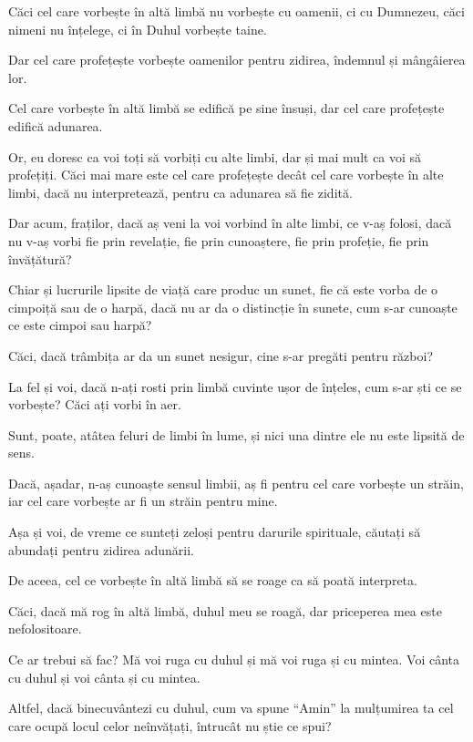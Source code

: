 {Căci cel care vorbește în altă limbă nu vorbește cu oamenii, ci cu Dumnezeu, căci nimeni nu înțelege, ci în Duhul vorbește taine.

Dar cel care profețește vorbește oamenilor pentru zidirea, îndemnul și mângâierea lor.

Cel care vorbește în altă limbă se edifică pe sine însuși, dar cel care profețește edifică adunarea.

Or, eu doresc ca voi toți să vorbiți cu alte limbi, dar și mai mult ca voi să profețiți. Căci mai mare este cel care profețește decât cel care vorbește în alte limbi, dacă nu interpretează, pentru ca adunarea să fie zidită.


\par }{\PP {}Dar acum, fraților, dacă aș veni la voi vorbind în alte limbi, ce v-aș folosi, dacă nu v-aș vorbi fie prin revelație, fie prin cunoaștere, fie prin profeție, fie prin învățătură?

Chiar și lucrurile lipsite de viață care produc un sunet, fie că este vorba de o cimpoiță sau de o harpă, dacă nu ar da o distincție în sunete, cum s-ar cunoaște ce este cimpoi sau harpă?

Căci, dacă trâmbița ar da un sunet nesigur, cine s-ar pregăti pentru război?

La fel și voi, dacă n-ați rosti prin limbă cuvinte ușor de înțeles, cum s-ar ști ce se vorbește? Căci ați vorbi în aer.

Sunt, poate, atâtea feluri de limbi în lume, și nici una dintre ele nu este lipsită de sens.

Dacă, așadar, n-aș cunoaște sensul limbii, aș fi pentru cel care vorbește un străin, iar cel care vorbește ar fi un străin pentru mine.

Așa și voi, de vreme ce sunteți zeloși pentru darurile spirituale, căutați să abundați pentru zidirea adunării.


\par }{\PP {}De aceea, cel ce vorbește în altă limbă să se roage ca să poată interpreta.

Căci, dacă mă rog în altă limbă, duhul meu se roagă, dar priceperea mea este nefolositoare.


\par }{\PP {}Ce ar trebui să fac? Mă voi ruga cu duhul și mă voi ruga și cu mintea. Voi cânta cu duhul și voi cânta și cu mintea.

Altfel, dacă binecuvântezi cu duhul, cum va spune “Amin” la mulțumirea ta cel care ocupă locul celor neînvățați, întrucât nu știe ce spui?

}
